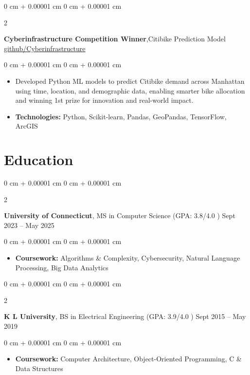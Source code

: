 \documentclass[10pt, letterpaper]{article}
\newenvironment{highlights}{
    \begin{itemize}[
        topsep=0.10 cm,
        parsep=0.10 cm,
        partopsep=0pt,
        itemsep=0pt,
        leftmargin=0 cm + 10pt
    ]
}{
    \end{itemize}
} %
\newenvironment{onecolentry}{
    \begin{adjustwidth}{
        0 cm + 0.00001 cm
    }{
        0 cm + 0.00001 cm
    }
}{
    \end{adjustwidth}
} %
\newenvironment{twocolentry}[2][]{
    \onecolentry
    \def\secondColumn{#2}
    \setcolumnwidth{\fill, 4.5 cm}
    \begin{paracol}{2}
}{
    \switchcolumn \raggedleft \secondColumn
    \end{paracol}
    \endonecolentry
} %
\begin{document}
    
    \vspace{0.20 cm}
        \begin{twocolentry}{
        \href{https://github.com/ramchandra3101/Cyberinfrastructure-competition}{github/Cyberinfrastructure}
            
        }
        
                

            \textbf{Cyberinfrastructure Competition Winner},Citibike Prediction Model\end{twocolentry}

        \vspace{0.10 cm}
        \begin{onecolentry}
            \begin{highlights}
                \item Developed Python ML models to predict Citibike demand across Manhattan using time, location, and demographic data, enabling smarter bike allocation and winning 1st prize for innovation and real-world impact.
                \item \textbf{Technologies:} Python, Scikit-learn, Pandas, GeoPandas, TensorFlow, ArcGIS
            \end{highlights}
        \end{onecolentry}
        
        \vspace{0.1 cm}
        
       
        
    \section{Education}
        \begin{twocolentry}{
            Sept 2023 – May 2025
        }
            \textbf{University of Connecticut}, MS in Computer Science (GPA: 3.8/4.0 )\end{twocolentry}

        \vspace{0.10 cm}
        \begin{onecolentry}
            \begin{highlights}
               
                \item \textbf{Coursework:} Algorithms \& Complexity, Cybersecurity, Natural Language Processing, Big Data Analytics
            \end{highlights}
        \end{onecolentry}
          \vspace{0.2 cm}
        \begin{twocolentry}{
            Sept 2015 – May 2019
        }
            \textbf{K L University}, BS in Electrical Engineering (GPA: 3.9/4.0 )\end{twocolentry}

        \vspace{0.10 cm}
        \begin{onecolentry}
            \begin{highlights}
                \item \textbf{Coursework:} Computer Architecture, Object-Oriented Programming, C \&  Data Structures
            \end{highlights}
        \end{onecolentry}
\end{document}
